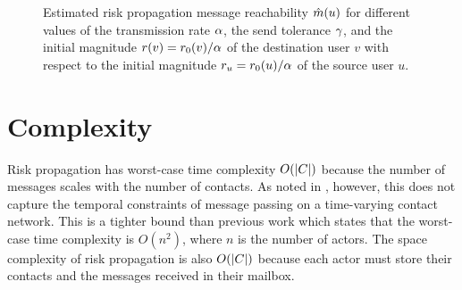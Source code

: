 \begin{figure}[htbp]
\caption[Estimated risk propagation message reachability]{Estimated risk propagation message reachability $\hat{m}(u)$ for different values of the transmission rate $\alpha$, the send tolerance $\gamma$, and the initial magnitude $r(v) = r_0(v) / \alpha$ of the destination user $v$ with respect to the initial magnitude $r_u = r_0(u) / \alpha$ of the source user $u$.}
\label{fig:reach}
\end{figure}

\section{Complexity}

Risk propagation has worst-case time complexity $O(\left\vert C \right\vert)$ because the number of messages scales with the number of contacts. As noted in , however, this does not capture the temporal constraints of message passing on a time-varying contact network. This is a tighter bound than previous work \cite{Ayday2021} which states that the worst-case time complexity is $O(n^2)$, where $n$ is the number of actors. The space complexity of risk propagation is also $O(\left\vert C \right\vert)$ because each actor must store their contacts and the messages received in their mailbox.



